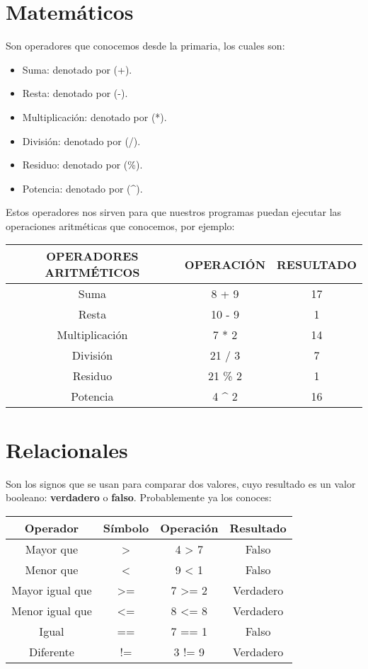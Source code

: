 \documentclass[
  11pt,
  a4paper,
  DIV=11,
  numbers=noendperiod]{scrreprt}
\providecommand{\tightlist}{%
  \setlength{\itemsep}{0pt}\setlength{\parskip}{0pt}}
\begin{document}
\section{Matemáticos}\label{matemuxe1ticos}

Son operadores que conocemos desde la primaria, los cuales son:

\begin{itemize}
\tightlist
\item
  Suma: denotado por (+).
\item
  Resta: denotado por (-).
\item
  Multiplicación: denotado por (*).
\item
  División: denotado por (/).
\item
  Residuo: denotado por (\%).
\item
  Potencia: denotado por (\^{}).
\end{itemize}

Estos operadores nos sirven para que nuestros programas puedan ejecutar
las operaciones aritméticas que conocemos, por ejemplo:

\begin{longtable}[]{@{}ccc@{}}
\toprule\noalign{}
OPERADORES ARITMÉTICOS & OPERACIÓN & RESULTADO \\
\midrule\noalign{}
\endhead
\bottomrule\noalign{}
\endlastfoot
Suma & 8 + 9 & 17 \\
Resta & 10 - 9 & 1 \\
Multiplicación & 7 * 2 & 14 \\
División & 21 / 3 & 7 \\
Residuo & 21 \% 2 & 1 \\
Potencia & 4 \^{} 2 & 16 \\
\end{longtable}

\section{Relacionales}\label{relacionales}

Son los signos que se usan para comparar dos valores, cuyo resultado es
un valor booleano: \textbf{verdadero} o \textbf{falso}. Probablemente ya
los conoces:

\begin{longtable}[]{@{}cccc@{}}
\toprule\noalign{}
Operador & Símbolo & Operación & Resultado \\
\midrule\noalign{}
\endhead
\bottomrule\noalign{}
\endlastfoot
Mayor que & \textgreater{} & 4 \textgreater{} 7 & Falso \\
Menor que & \textless{} & 9 \textless{} 1 & Falso \\
Mayor igual que & \textgreater= & 7 \textgreater= 2 & Verdadero \\
Menor igual que & \textless= & 8 \textless= 8 & Verdadero \\
Igual & == & 7 == 1 & Falso \\
Diferente & != & 3 != 9 & Verdadero \\
\end{longtable}
\end{document}
